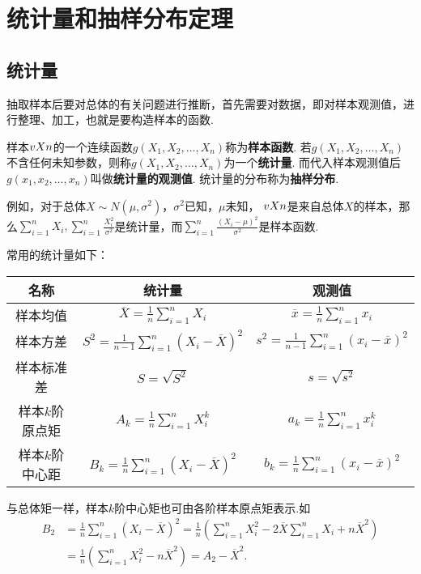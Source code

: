\section{统计量和抽样分布定理}
\subsection{统计量}
抽取样本后要对总体的有关问题进行推断，首先需要对数据，即对样本观测值，进行整理、加工，也就是要构造样本的函数.

\begin{definition}
\def\g#1{g(#1_1,#1_2,\dotsc,#1_n)}
样本\(v{X}{n}\)的一个连续函数\(\g{X}\)称为\textbf{样本函数}.
若\(\g{X}\)不含任何未知参数，则称\(\g{X}\)为一个\textbf{统计量}.
而代入样本观测值后\(\g{x}\)叫做\textbf{统计量的观测值}.
统计量的分布称为\textbf{抽样分布}.

例如，对于总体\(X \sim N(\mu,\sigma^2)\)，\(\sigma^2\)已知，\(\mu\)未知，%
\(v{X}{n}\)是来自总体\(X\)的样本，那么\(\sum\limits_{i=1}^n X_i, \sum\limits_{i=1}^n \frac{X_i^2}{\sigma^2}\)是统计量，而\(\sum\limits_{i=1}^n \frac{(X_i-\mu)^2}{\sigma^2}\)是样本函数.

常用的统计量如下：
\begin{center}
\def\arraystretch{2.1}
\begin{tabular}{|*{3}{c|}}
\hline
名称 & 统计量 & 观测值 \\ \hline
样本均值 & \(\overline{X} = \frac{1}{n} \sum\limits_{i=1}^n X_i\) & \(\overline{x} = \frac{1}{n} \sum\limits_{i=1}^n x_i\) \\ \hline
样本方差 & \(S^2 = \frac{1}{n-1} \sum\limits_{i=1}^n (X_i-\overline{X})^2\) & \(s^2 = \frac{1}{n-1} \sum\limits_{i=1}^n (x_i-\overline{x})^2\) \\ \hline
样本标准差 & \(S=\sqrt{S^2}\) & \(s=\sqrt{s^2}\) \\ \hline
样本\(k\)阶原点矩 & \(A_k=\frac{1}{n} \sum\limits_{i=1}^n X_i^k\) & \(a_k=\frac{1}{n} \sum\limits_{i=1}^n x_i^k\) \\ \hline
样本\(k\)阶中心距 & \(B_k=\frac{1}{n} \sum\limits_{i=1}^n (X_i-\overline{X})^2\) & \(b_k=\frac{1}{n} \sum\limits_{i=1}^n (x_i-\overline{x})^2\) \\ \hline
\end{tabular}
\end{center}
\end{definition}

与总体矩一样，样本\(k\)阶中心矩也可由各阶样本原点矩表示.如\begin{align*}
B_2 &= \frac{1}{n} \sum\limits_{i=1}^n{(X_i-\overline{X})^2}
= \frac{1}{n} \left(\sum\limits_{i=1}^n{X_i^2}-2\overline{X}\sum\limits_{i=1}^n{X_i}+n\overline{X}^2\right) \\
&= \frac{1}{n} \left(\sum\limits_{i=1}^n{X_i^2}-n\overline{X}^2\right)
= A_2 - \overline{X}^2.
\end{align*}

